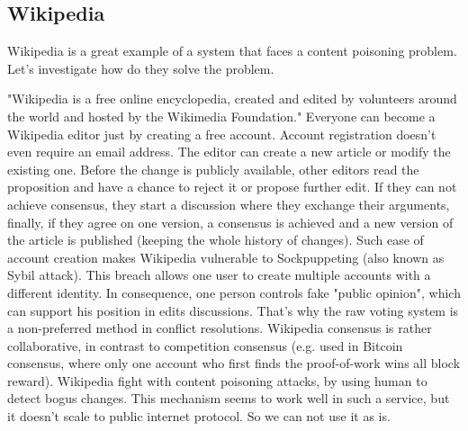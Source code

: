 \documentclass[nostrict]{szablonPG}
\begin{document}
\subsection{Wikipedia}
Wikipedia is a great example of a system that faces a content poisoning problem. Let's investigate how do they solve the problem. 

"Wikipedia is a free online encyclopedia, created and edited by volunteers around the world and hosted by the Wikimedia Foundation."
Everyone can become a Wikipedia editor just by creating a free account. Account registration doesn't even require an email address. The editor can create a new article or modify the existing one. Before the change is publicly available, other editors read the proposition and have a chance to reject it or propose further edit. If they can not achieve consensus, they start a discussion where they exchange their arguments, finally, if they agree on one version, a consensus is achieved and a new version of the article is published (keeping the whole history of changes).
Such ease of account creation makes Wikipedia vulnerable to Sockpuppeting (also known as Sybil attack). This breach allows one user to create multiple accounts with a different identity. In consequence, one person controls fake "public opinion", which can support his position in edits discussions. That's why the raw voting system is a non-preferred method in conflict resolutions. Wikipedia consensus is rather collaborative, in contrast to competition consensus (e.g. used in Bitcoin consensus, where only one account who first finds the proof-of-work wins all block reward). 
Wikipedia fight with content poisoning attacks, by using human to detect bogus changes. This mechanism seems to work well in such a service, but it doesn't scale to public internet protocol. So we can not use it as is.
\end{document}
